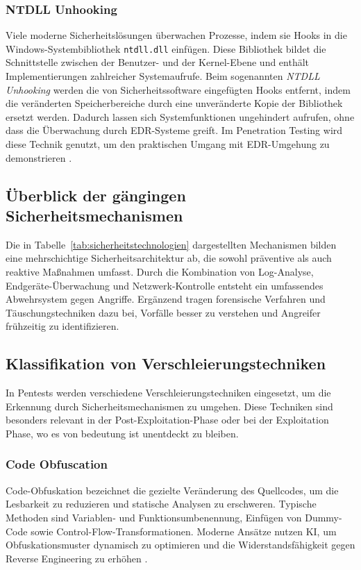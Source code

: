 \subsubsection{NTDLL Unhooking}
Viele moderne Sicherheitslösungen überwachen Prozesse, indem sie Hooks in die Windows-Systembibliothek \texttt{ntdll.dll} einfügen. Diese Bibliothek bildet die Schnittstelle zwischen der Benutzer- und der Kernel-Ebene und enthält Implementierungen zahlreicher Systemaufrufe. Beim sogenannten \textit{NTDLL Unhooking} werden die von Sicherheitssoftware eingefügten Hooks entfernt, indem die veränderten Speicherbereiche durch eine unveränderte Kopie der Bibliothek ersetzt werden. Dadurch lassen sich Systemfunktionen ungehindert aufrufen, ohne dass die Überwachung durch EDR-Systeme greift. Im Penetration Testing wird diese Technik genutzt, um den praktischen Umgang mit EDR-Umgehung zu demonstrieren \cite{bernardinetti2023_edr, volatility_edr_whitepaper}.
\newpage
\subsection{Überblick der gängingen Sicherheitsmechanismen}
\begin{table}[H]
\centering

\end{table}
Die in Tabelle~\ref{tab:sicherheitstechnologien} dargestellten Mechanismen bilden eine mehrschichtige Sicherheitsarchitektur ab, die sowohl präventive als auch reaktive Maßnahmen umfasst. Durch die Kombination von Log-Analyse, Endgeräte-Überwachung und Netzwerk-Kontrolle entsteht ein umfassendes Abwehrsystem gegen Angriffe. Ergänzend tragen forensische Verfahren und Täuschungstechniken dazu bei, Vorfälle besser zu verstehen und Angreifer frühzeitig zu identifizieren.

\newpage
\subsection{Klassifikation von Verschleierungstechniken}
In Pentests werden verschiedene Verschleierungstechniken eingesetzt, um die Erkennung durch Sicherheitsmechanismen zu umgehen. Diese Techniken sind besonders relevant in der Post-Exploitation-Phase oder bei der Exploitation Phase, wo es von bedeutung ist unentdeckt zu bleiben. 
\subsubsection{Code Obfuscation}
Code-Obfuskation bezeichnet die gezielte Veränderung des Quellcodes, um die Lesbarkeit zu reduzieren und statische Analysen zu erschweren. Typische Methoden sind Variablen- und Funktionsumbenennung, Einfügen von Dummy-Code sowie Control-Flow-Transformationen. Moderne Ansätze nutzen KI, um Obfuskationsmuster dynamisch zu optimieren und die Widerstandsfähigkeit gegen Reverse Engineering zu erhöhen \cite{golovko2024obfuscation}.
